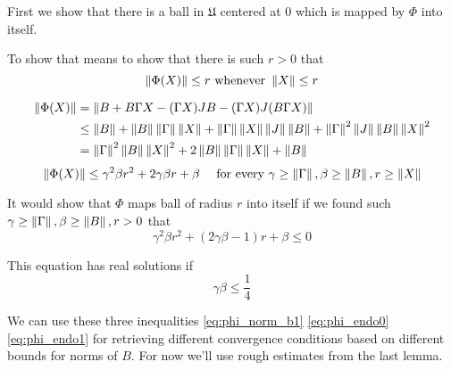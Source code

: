 \documentclass{article}
\begin{document}
First we show that there is a ball in \( \mathfrak U \) centered at \( 0 \)
which is mapped by \( \Phi \) into itself.

To show that
means to show that there is such \( r>0 \) that
\[\left\|{\Phi(X)}\right\| \leq r \text{ whenever } \left\|{X}\right\|\leq r\]

    \begin{align*}
        \left\|{\Phi(X)}\right\| &=    \left\|{B + B\Gamma X - (\Gamma X) JB - (\Gamma X)J(B\Gamma X)}\right\| \\
                     &\leq \left\|{B}\right\| + \left\|{B}\right\|\left\|{\Gamma}\right\| \left\|{X}\right\| + \left\|{\Gamma}\right\|\left\|{X}\right\|\left\|{J}\right\|\left\|{B}\right\| + \left\|{\Gamma}\right\|^2\left\|{J}\right\|\left\|{B}\right\|\left\|{X}\right\|^2 \\
                     & = \left\|{\Gamma}\right\|^2\left\|{B}\right\|\left\|{X}\right\|^2 + 2\left\|{B}\right\|\left\|{\Gamma}\right\|\left\|{X}\right\| + \left\|{B}\right\|
    \end{align*}
    \begin{equation}
        \label{eq:phi_norm_b1}
        \left\|{\Phi(X)}\right\|
        \leq
            \gamma^2\beta r^2 + 2\gamma\beta r + \beta
            \quad \text{ for every } \gamma\geq\left\|{\Gamma}\right\|, \beta\geq\left\|{B}\right\|, r\geq\left\|{X}\right\|
    \end{equation}

    It would show that \( \Phi \) maps ball of radius \( r \) into itself
    if we found such \( \gamma\geq\left\|{\Gamma}\right\|, \beta\geq\left\|{B}\right\|, r>0 \)
    that
\begin{equation}\label{eq:phi_endo0}
    \gamma^2\beta r^2 + (2\gamma\beta - 1) r + \beta \leq 0
\end{equation}

This equation has real solutions if
\begin{equation}\label{eq:phi_endo1}
    \gamma\beta\leq\frac14
\end{equation}

We can use these three inequalities \eqref{eq:phi_norm_b1} \eqref{eq:phi_endo0} \eqref{eq:phi_endo1}
for retrieving different convergence conditions based on different bounds for norms of \( B \).
For now we'll use rough estimates from the last lemma.
\end{document}
